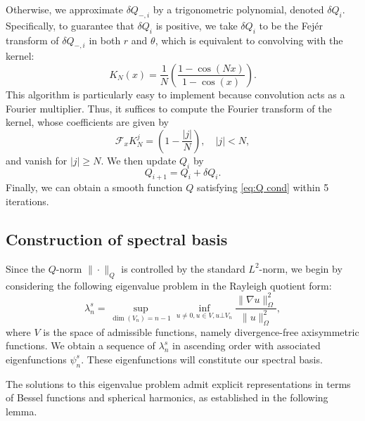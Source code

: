 \documentclass[11pt,a4paper]{article}
\numberwithin{equation}{section}
\newcommand{\cdummy}{\cdot}
\begin{document}
Otherwise, we approximate $\delta Q_{-, i}$ by a trigonometric polynomial,
denoted $\delta Q_i$. Specifically, to guarantee that $\delta Q_i$ is positive, we take $\delta Q_i$ to be the Fej{\'e}r
transform of $\delta Q_{-, i}$ in both $r$ and $\theta$, which is equivalent
to convolving with the kernel:
\[ K_N (x) = \frac{1}{N} \left( \frac{1 - \cos (N x)}{1 - \cos (x)} \right) .
\]
This algorithm is particularly easy to implement because convolution acts as a
Fourier multiplier. Thus, it suffices to compute the Fourier transform of the
kernel, whose coefficients are given by
\[ \mathcal{F}_x K_N^j = \left( 1 - \frac{| j |}{N} \right), \quad | j | < N,
\]
and vanish for $| j | \geqslant N$. We then update $Q_i$ by
\[ Q_{i + 1} = Q_i + \delta Q_i . \]
Finally, we can obtain a smooth function $Q$ satisfying \eqref{eq:Q cond} within 5 iterations.

\subsection{Construction of spectral basis}\label{subSec:numfr}

Since the $Q$-norm $\| \cdummy \|_Q$ is controlled by the standard $L^2$-norm,
we begin by considering the following eigenvalue problem in the Rayleigh quotient
form:
\begin{equation}
  \lambda_n^s = \sup_{\dim (V_n) = n - 1} \inf_{u \neq 0, u \in V, u \bot V_n}
  \frac{\| \nabla u\|^2_{\Omega}}{\|u\|^2_{\Omega}}, \label{rayleigh}
\end{equation}
where $V$ is the space of admissible functions, namely divergence-free
axisymmetric functions. We obtain a sequence of $\lambda_n^s$ in ascending
order with associated eigenfunctions $\psi_n^s$. These eigenfunctions will
constitute our spectral basis.

The solutions to this eigenvalue problem admit explicit representations in
terms of Bessel functions and spherical harmonics, as established in the
following lemma.
\end{document}
